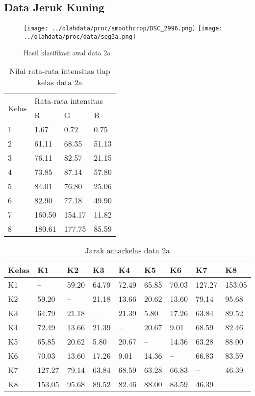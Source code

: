 \documentclass[laporan.tex]{subfiles}
\begin{document}
\subsection{Data Jeruk Kuning}

\begin{figure}[h!]
\centering
\texttt{[image: ../olahdata/proc/smoothcrop/DSC\_2996.png]}
\texttt{[image: ../olahdata/proc/data/seg3a.png]}
\caption{Hasil klasifikasi awal data 2a}
\end{figure}

\begin{table}[h!]
\centering
\begin{tabular}{|l|l|l|l|}
\cline{1-4}
\multirow{2}{*}{Kelas} & \multicolumn{3}{l|}{Rata-rata intensitas} \\
\cline{2-4}
 & R & G & B \\
\cline{1-4}
1 & 1.67 & 0.72 & 0.75 \\
2 & 61.11 & 68.35 & 51.13 \\
3 & 76.11 & 82.57 & 21.15 \\
4 & 73.85 & 87.14 & 57.80 \\
5 & 84.01 & 76.80 & 25.06 \\
6 & 82.90 & 77.18 & 49.90 \\
7 & 160.50 & 154.17 & 11.82 \\
8 & 180.61 & 177.75 & 85.59 \\
\cline{1-4}
\end{tabular}
\caption{Nilai rata-rata intensitas tiap kelas data 2a}
\label{table:avgyellow1}
\end{table}

\begin{table}[h!]
\centering
\begin{tabular}{|l|l|l|l|l|l|l|l|l|}
\hline
Kelas & K1 & K2 & K3 & K4 & K5 & K6 & K7 & K8 \\
\hline
K1 & -- & 59.20 & 64.79 & 72.49 & 65.85 & 70.03 & 127.27 & 153.05 \\
K2 & 59.20 & -- & 21.18 & 13.66 & 20.62 & 13.60 & 79.14 & 95.68 \\
K3 & 64.79 & 21.18 & --	& 21.39 & 5.80 & 17.26 & 63.84 & 89.52 \\
K4 & 72.49 & 13.66 & 21.39 & --	& 20.67 & 9.01 & 68.59 & 82.46 \\
K5 & 65.85 & 20.62 & 5.80 & 20.67 & -- & 14.36 & 63.28 & 88.00 \\
K6 & 70.03 & 13.60 & 17.26 & 9.01 & 14.36 & -- & 66.83 & 83.59 \\
K7 & 127.27 & 79.14 & 63.84 & 68.59 & 63.28 & 66.83 & -- & 46.39 \\
K8 & 153.05 & 95.68 & 89.52 & 82.46 & 88.00 & 83.59 & 46.39 & -- \\
\hline
\end{tabular}
\caption{Jarak antarkelas data 2a}
\label{table:distyellow}
\end{table}
\end{document}
